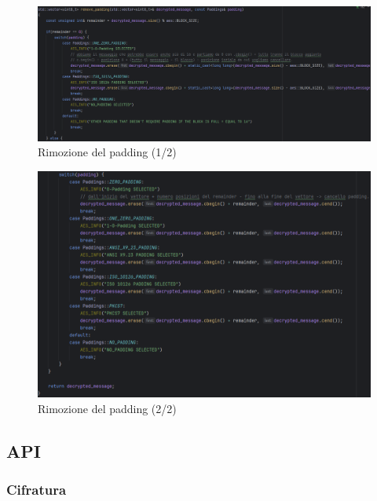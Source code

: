 \begin{figure}[H]
	\centering
	\includegraphics[width=1\textwidth, height=1\textheight, keepaspectratio]{./images/code/cpp/padding/remove_padding0.PNG}
	\caption{Rimozione del padding (1/2)}
	\label{fig:remove_padding0}
\end{figure}

\begin{figure}[H]
	\centering
	\includegraphics[width=1\textwidth, height=1\textheight, keepaspectratio]{./images/code/cpp/padding/remove_padding1.PNG}
	\caption{Rimozione del padding (2/2)}
	\label{fig:remove_padding1}
\end{figure}

\subsection{API}

\textsf{\small }


\subsubsection{Cifratura}

